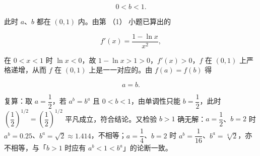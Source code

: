 \begin{answer}
\nopagebreak[4]
\[
0<b<1.
\]

此时 $a$、$b$ 都在 $(0,1)$ 内。由第 （1） 小题已算出的

\nopagebreak[4]
\[
f'(x)=\frac{1-\ln x}{x^2},
\]

在 $0<x<1$ 时 $\ln x<0$，故 $1-\ln x>1>0$，$f'(x)>0$，$f$ 在 $(0,1)$ 上严格递增，从而 $f$ 在 $(0,1)$ 上是一一对应的。由 $f(a)=f(b)$ 得

\nopagebreak[4]
\[
a=b.
\]

复算：取 $a=\dfrac12$，若 $a^b=b^a$ 且 $0<b<1$，由单调性只能 $b=\dfrac12$，此时 $\left(\dfrac12\right)^{1/2}=\left(\dfrac12\right)^{1/2}$ 平凡成立，符合结论。又检验 $b>1$ 确无解：$a=\dfrac12$、$b=2$ 时 $a^b=0.25$、$b^a=\sqrt2\approx1.414$，不相等；$a=\dfrac14$、$b=2$ 时 $a^b=\dfrac1{16}$、$b^a=\sqrt[4]{2}$，亦不相等，与「$b>1$ 时应有 $a^b<1<b^a$」的论断一致。



\end{answer}